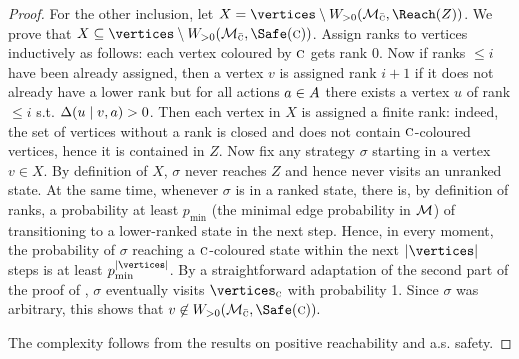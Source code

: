 \begin{proof}
For the other inclusion, let $ X = \vertices \setminus \winPos(\mdp_{\bar{\genColour}},\Reach(Z)) $. We prove that $ X\subseteq \vertices \setminus \winPos(\mdp_{\bar{\genColour}},\Safe(\genColour)) $. Assign ranks to vertices inductively as follows: each vertex coloured by $ \textsc{c} $ gets rank $ 0 $. Now if ranks $ \leq i $ have been already assigned, then a vertex  $ v $ is assigned rank $i+1  $ if it  does  not already have a lower rank but for all actions $ a\in A $ there exists a vertex $ u $ of rank $ \leq i $ s.t. $ \Delta(u \mid v,a) >0$. Then each vertex in $ X $ is assigned a finite rank: indeed, the set of vertices without a rank is closed and does not contain $ \textsc{c} $-coloured vertices, hence it is contained in $ Z $. 
Now fix any strategy $ \sigma $ starting in a vertex $v \in X $. By definition of $ X $, $ \sigma $ never reaches $ Z $ and hence never visits an unranked state. At the same time, whenever $ \sigma $ is in a ranked state, there is, by definition of ranks, a probability at least $p_{\min}  $ (the minimal edge probability in $ \mathcal{M} $) of transitioning to a lower-ranked state in the next step. Hence, in every moment, the probability of $ \sigma $ reaching a $ \textsc{c} $-coloured state within the next $ |\vertices| $ steps is at least $ p_{\min}^{|\vertices|} $. By a straightforward adaptation of the second part of the proof of , $ \sigma $ eventually visits $ \vertices_{\genColour} $ with probability 1. Since $ \sigma $ was arbitrary, this shows that $ v\not \in\winPos(\mdp_{\bar{\genColour}},\Safe(\genColour)).  $

The complexity follows from the results on positive reachability and a.s. safety.
\end{proof}

%



